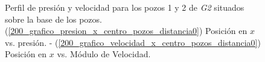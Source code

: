 \documentclass[10pt,a4paper,final]{article}
\begin{document}
\begin{figure}[tbhp]
   \centering
   \hspace{0.1\linewidth}
    \caption{Perfil de presión y velocidad para los pozos 1 y 2 de \emph{G2} situados sobre la base de los pozos. (\ref{200_grafico_presion_x_centro_pozos_distancia0}) Posición en $x$ vs. presión. - (\ref{200_grafico_velocidad_x_centro_pozos_distancia0}) Posición en $x$ vs. Módulo de Velocidad.}
   \label{200_grafico_velocidad_presion_centro_pozos_distancia0}                %
\end{figure}
%
\end{document}
